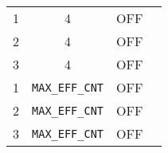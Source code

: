 \begin{table}[ht]
\begin{tabular}{c | c | c | c }
	   1	& 4 & OFF & \\ 
	   2	& 4 & OFF & \\ 
	   3	& 4 & OFF & \\ 
	   1	& {\tt MAX\_EFF\_CNT} & OFF & \\ 
	   2	& {\tt MAX\_EFF\_CNT}  & OFF & \\ 
	   3	& {\tt MAX\_EFF\_CNT}  & OFF & \\ 
	   \hline\hline
	\end{tabular}
\end{table}








